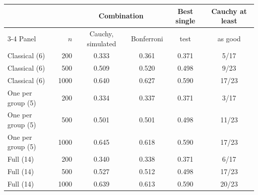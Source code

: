 \begin{tabular}{lrcccc}
\toprule
 & & \multicolumn{2}{c}{Combination} & Best single & Cauchy at least \\
\cmidrule(lr){3-4}
Panel & $n$ & Cauchy, simulated & Bonferroni & test & as good \\
\midrule
Classical (6) & 200 & 0.333 & 0.361 & 0.371 & 5/17 \\
Classical (6) & 500 & 0.509 & 0.520 & 0.498 & 9/23 \\
Classical (6) & 1000 & 0.640 & 0.627 & 0.590 & 17/23 \\
\addlinespace
One per group (5) & 200 & 0.334 & 0.337 & 0.371 & 3/17 \\
One per group (5) & 500 & 0.501 & 0.501 & 0.498 & 11/23 \\
One per group (5) & 1000 & 0.645 & 0.618 & 0.590 & 17/23 \\
\addlinespace
Full (14) & 200 & 0.340 & 0.338 & 0.371 & 6/17 \\
Full (14) & 500 & 0.527 & 0.512 & 0.498 & 17/23 \\
Full (14) & 1000 & 0.639 & 0.613 & 0.590 & 20/23 \\
\bottomrule
\end{tabular}